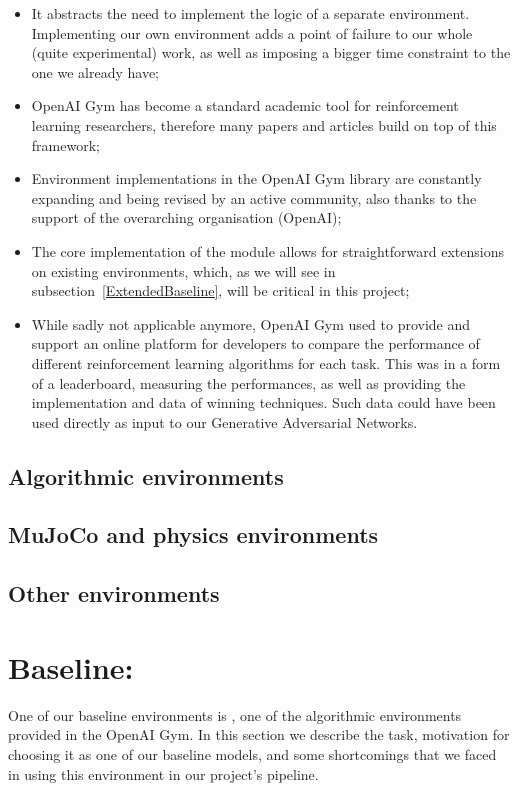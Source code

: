 \begin{itemize}
	\item It abstracts the need to implement the logic of a separate environment. Implementing our own environment adds a point of failure to our whole (quite experimental) work, as well as imposing a bigger time constraint to the one we already have;
	\item OpenAI Gym has become a standard academic tool for reinforcement learning researchers, therefore many papers and articles build on top of this framework;
	\item Environment implementations in the OpenAI Gym library are constantly expanding and being revised by an active community, also thanks to the support of the overarching organisation (OpenAI);
	\item The core implementation of the  module \parencite{gymgymat12:online} allows for straightforward extensions on existing environments, which, as we will see in subsection~\ref{ExtendedBaseline}, will be critical in this project;
	\item While sadly not applicable anymore, OpenAI Gym used to provide and support an online platform for developers to compare the performance of different reinforcement learning algorithms for each task. This was in a form of a leaderboard, measuring the performances, as well as providing the implementation and data of winning techniques. Such data could have been used directly as input to our Generative Adversarial Networks.
\end{itemize}

\subsection{Algorithmic environments}
\subsection{MuJoCo and physics environments}
\subsection{Other environments}


\section{Baseline: }
One of our baseline environments is  \parencite{OpenAIGy42:online}, one of the algorithmic environments provided in the OpenAI Gym. In this section we describe the task, motivation for choosing it as one of our baseline models, and some shortcomings that we faced in using this environment in our project's pipeline.
